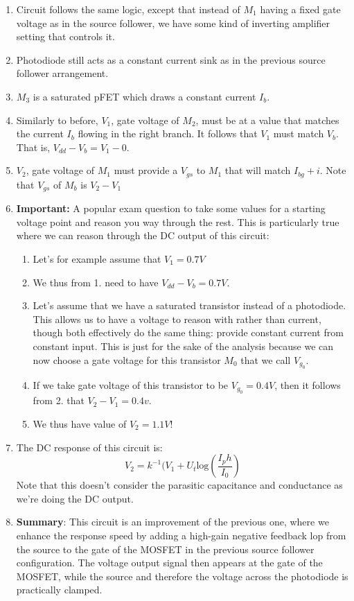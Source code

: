 \begin{enumerate}
    \item Circuit follows the same logic, except that instead of $M_1$ having a fixed gate voltage as in the source follower, we have some kind of inverting amplifier setting that controls it. 
    \item Photodiode still acts as a constant current sink as in the previous source follower arrangement.
    \item $M_3$ is a saturated pFET which draws a constant current $I_b$. 
    \item Similarly to before, $V_1$, gate voltage of $M_2$, must be at a value that matches the current $I_b$ flowing in the right branch. It follows that $V_1$ must match $V_b$. That is, $V_{dd} - V_b = V_1 - 0$.
    \item $V_2$, gate voltage of $M_1$ must provide a $V_{gs}$ to $M_1$ that will match $I_{bg} + i$. Note that $V_{gs}$ of $M_b$ is $V_2 - V_1$
    \item \textbf{Important:} A popular exam question to take some values for a starting voltage point and reason you way through the rest. This is particularly true where we can reason through the DC output of this circuit: 
    \begin{enumerate}
        \item Let's for example assume that $V_1 = 0.7V$
        \item We thus from 1. need to have $V_{dd} - V_b = 0.7V$.
        \item Let's assume that we have a saturated transistor instead of a photodiode. This allows us to have a voltage to reason with rather than current, though both effectively do the same thing: provide constant current from constant input. This is just for the sake of the analysis because we can now choose a gate voltage for this transistor $M_0$ that we call $V_g_0$.
        \item If we take gate voltage of this transistor to be $V_g_0 = 0.4 V$, then it follows from 2. that $V_2 - V_1 = 0.4 v$. 
        \item We thus have value of $V_2 = 1.1 V$! 
    \end{enumerate}
    \item The DC response of this circuit is: 
    \begin{equation}
        V_2 = k^{-1}(V_1 + U_t\mathrm{log}(\frac{I_ph}{I_0})
    \end{equation}
    Note that this doesn't consider the parasitic capacitance and conductance as we're doing the DC output. 
    \item \textbf{Summary}: This circuit is an improvement of the previous one, where we enhance the response speed by adding a high-gain negative feedback lop from the source to the gate of the MOSFET in the previous source follower configuration. The voltage output signal then appears at the gate of the MOSFET, while the source and therefore the voltage across the photodiode is practically clamped.
\end{enumerate}


